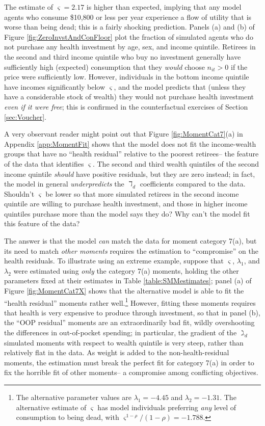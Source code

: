 \documentclass[12pt,pdftex,letterpaper]{article}
\newcommand{\Invst}{n}
\newcommand{\LifeUtility}{\varsigma}
\newcommand{\CRRAcon}{\rho}
\newcommand{\HealthProdParamAlt}{\lambda}
\begin{document}
The estimate of $\LifeUtility=2.17$ is higher than expected, implying that any model agents who consume \$10,800 or less per year experience a flow of utility that is worse than being dead; this is a fairly shocking prediction.  Panels (a) and (b) of Figure \ref{fig:ZeroInvstAndConFloor} plot the fraction of simulated agents who do not purchase any health investment by age, sex, and income quintile.  Retirees in the second and third income quintile who buy no investment generally have sufficiently high (expected) consumption that they \textit{would} choose $\Invst_{it} > 0$ if the price were sufficiently low.  However, individuals in the bottom income quintile have incomes significantly below $\LifeUtility$, and the model predicts that (unless they have a considerable stock of wealth) they would not purchase health investment \textit{even if it were free}; this is confirmed in the counterfactual exercises of Section \ref{sec:Voucher}.

A very observant reader might point out that Figure \ref{fig:MomentCat7}(a) in Appendix \ref{app:MomentFit} shows that the model does not fit the income-wealth groups that have no ``health residual'' relative to the poorest retirees-- the feature of the data that identifies $\LifeUtility$.  The second and third wealth quintiles of the second income quintile \textit{should} have positive residuals, but they are zero instead; in fact, the model in general \textit{underpredicts} the $\daleth_d$ coefficients compared to the data. Shouldn't $\LifeUtility$ be lower so that more simulated retirees in the second income quintile are willing to purchase health investment, and those in higher income quintiles purchase more than the model says they do?  Why can't the model fit this feature of the data?

The answer is that the model \textit{can} match the data for moment category 7(a), but its need to match \textit{other moments} requires the estimation to ``compromise'' on the health residuals.  To illustrate using an extreme example, suppose that $\LifeUtility$, $\HealthProdParamAlt_1$, and $\HealthProdParamAlt_2$ were estimated using \textit{only} the category 7(a) moments, holding the other parameters fixed at their estimates in Table \ref{table:SMMestimates}; panel (a) of Figure \ref{fig:MomentCat7X} shows that the alternative model is able to fit the ``health residual'' moments rather well.\footnote{The alternative parameter values are $\HealthProdParamAlt_1=-4.45$ and $\HealthProdParamAlt_2=-1.31$.  The alternative estimate of $\LifeUtility$ has model individuals preferring \textit{any} level of consumption to being dead, with $\LifeUtility^{1-\CRRAcon}/(1-\CRRAcon)=-1.788$.}  However, fitting these moments requires that health is very expensive to produce through investment, so that in panel (b), the ``OOP residual'' moments are an extraordinarily bad fit, wildly overshooting the differences in out-of-pocket spending; in particular, the gradient of the $\gimel_d$ simulated moments with respect to wealth quintile is very steep, rather than relatively flat in the data.  As weight is added to the non-health-residual moments, the estimation must break the perfect fit for category 7(a) in order to fix the horrible fit of other moments-- a compromise among conflicting objectives.
\end{document}
